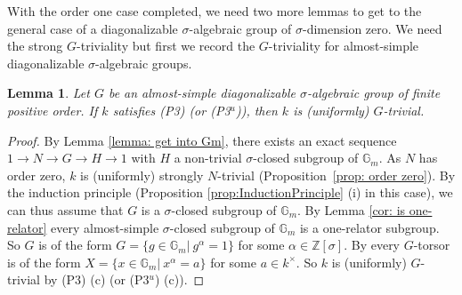 \documentclass[oneside,reqno]{amsart}
\newtheorem{lemma}[theo]{Lemma}
\theoremstyle{definition}
\newcommand{\s}{\sigma}
\newcommand{\Gm}{\mathbb{G}_m}
\newcommand{\ZZ}{\mathbb{Z}}
\newcommand{\pt}{{\rm{(P3$^u$)}}}
\newcommand{\ptweak}{{\rm{(P3)}}}
\begin{document}
With the order one case completed, we need two more lemmas to get to the general case of a diagonalizable $\s$-algebraic group of $\s$-dimension zero. We need the strong $G$-triviality but first we record the $G$-triviality for almost-simple diagonalizable $\s$-algebraic groups.


\begin{lemma} \label{lemma: almost-simple diagonalizable}
	Let $G$ be an almost-simple diagonalizable $\s$-algebraic group of finite positive order. If $k$ satisfies \ptweak{} (or \pt{}), then 
	$k$ is (uniformly) $G$-trivial.
\end{lemma}	
\begin{proof}
	By Lemma \ref{lemma: get into Gm}, there exists an exact sequence $1\to N\to G\to H\to 1$ with $H$ a non-trivial $\s$-closed subgroup of $\Gm$. As $N$ has order zero, $k$ is (uniformly) strongly $N$-trivial (Proposition~\ref{prop: order zero}). By the induction principle (Proposition \ref{prop:InductionPrinciple} (i) in this case), we can thus assume that $G$ is a $\s$-closed subgroup of $\Gm$. By Lemma \ref{cor: is one-relator} every almost-simple $\s$-closed subgroup of $\Gm$ is a one-relator subgroup. So $G$ is of the form $G=\{g\in\Gm|\ g^\alpha=1\}$ for some $\alpha\in \ZZ[\s]$. By  \cite[Example 4.2]{BachmayrWibmer:TorsorsForDifferenceAlgebraicGroups} every $G$-torsor is of the form $X=\{x\in\Gm|\ x^\alpha=a\}$ for some $a\in k^\times$. So $k$ is (uniformly) $G$-trivial by \ptweak{} (c) (or \pt{} (c)). 
\end{proof}	
\end{document}
